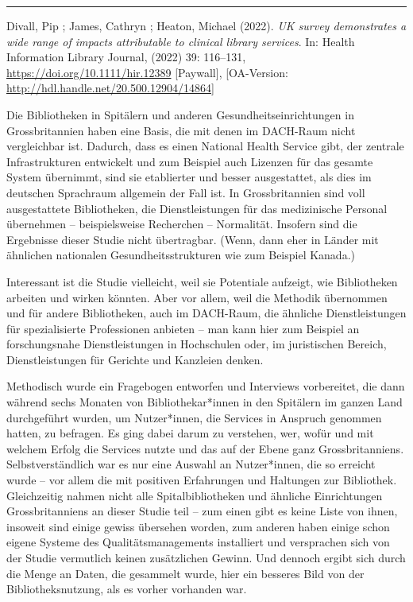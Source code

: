 \documentclass[a4paper,
fontsize=11pt,
oneside,
numbers=noperiodatend,
parskip=half-,
bibliography=totoc,
final
]{scrartcl}
\begin{document}
\begin{center}\rule{0.5\linewidth}{0.5pt}\end{center}

Divall, Pip ; James, Cathryn ; Heaton, Michael (2022). \emph{UK survey
demonstrates a wide range of impacts attributable to clinical library
services}. In: Health Information Library Journal, (2022) 39: 116--131,
\url{https://doi.org/10.1111/hir.12389} {[}Paywall{]}, {[}OA-Version:
\url{http://hdl.handle.net/20.500.12904/14864}{]}

Die Bibliotheken in Spitälern und anderen Gesundheitseinrichtungen in
Grossbritannien haben eine Basis, die mit denen im DACH-Raum nicht
vergleichbar ist. Dadurch, dass es einen National Health Service gibt,
der zentrale Infrastrukturen entwickelt und zum Beispiel auch Lizenzen
für das gesamte System übernimmt, sind sie etablierter und besser
ausgestattet, als dies im deutschen Sprachraum allgemein der Fall ist.
In Grossbritannien sind voll ausgestattete Bibliotheken, die
Dienstleistungen für das medizinische Personal übernehmen --
beispielsweise Recherchen -- Normalität. Insofern sind die Ergebnisse
dieser Studie nicht übertragbar. (Wenn, dann eher in Länder mit
ähnlichen nationalen Gesundheitsstrukturen wie zum Beispiel Kanada.)

Interessant ist die Studie vielleicht, weil sie Potentiale aufzeigt, wie
Bibliotheken arbeiten und wirken könnten. Aber vor allem, weil die
Methodik übernommen und für andere Bibliotheken, auch im DACH-Raum, die
ähnliche Dienstleistungen für spezialisierte Professionen anbieten --
man kann hier zum Beispiel an forschungsnahe Dienstleistungen in
Hochschulen oder, im juristischen Bereich, Dienstleistungen für Gerichte
und Kanzleien denken.

Methodisch wurde ein Fragebogen entworfen und Interviews vorbereitet,
die dann während sechs Monaten von Bibliothekar*innen in den Spitälern
im ganzen Land durchgeführt wurden, um Nutzer*innen, die Services in
Anspruch genommen hatten, zu befragen. Es ging dabei darum zu verstehen,
wer, wofür und mit welchem Erfolg die Services nutzte und das auf der
Ebene ganz Grossbritanniens. Selbstverständlich war es nur eine Auswahl
an Nutzer*innen, die so erreicht wurde -- vor allem die mit positiven
Erfahrungen und Haltungen zur Bibliothek. Gleichzeitig nahmen nicht alle
Spitalbibliotheken und ähnliche Einrichtungen Grossbritanniens an dieser
Studie teil -- zum einen gibt es keine Liste von ihnen, insoweit sind
einige gewiss übersehen worden, zum anderen haben einige schon eigene
Systeme des Qualitätsmanagements installiert und versprachen sich von
der Studie vermutlich keinen zusätzlichen Gewinn. Und dennoch ergibt
sich durch die Menge an Daten, die gesammelt wurde, hier ein besseres
Bild von der Bibliotheksnutzung, als es vorher vorhanden war.
\end{document}
